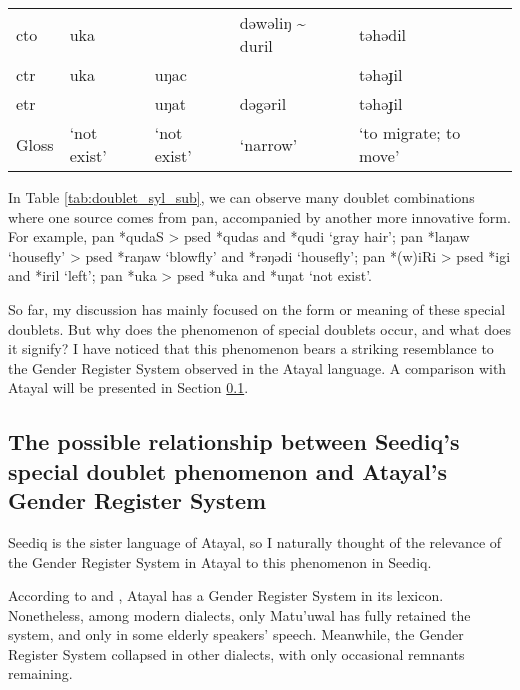 \begin{table}[!htbp]
\begin{tabular}{lllll}
\acs{cto}  & uka          &                                                  & dəwəliŋ \~{} duril & təhədil              \\
\acs{ctr}  & uka          & uŋac                                             &                    & təhəɟil              \\
\acs{etr}  &              & uŋat                                             & dəgəril            & təhəɟil              \\
Gloss      & `not exist'  & `not exist'                                      & `narrow'           & `to migrate; to move' \\ \hline
\end{tabular}
\end{table}

In Table \ref{tab:doublet_syl_sub}, we can observe many doublet combinations where one source comes from \acl{pan}, accompanied by another more innovative form. For example, \acs{pan} *qudaS > \acl{psed} *qudas and *qudi `gray hair'; \acs{pan} *laŋaw `housefly' > \acl{psed} *raŋaw `blowfly' and *rəŋədi `housefly'; \acs{pan} *(w)iRi > \acl{psed} *igi and *iril `left'; \acs{pan} *uka > \acl{psed} *uka and *uŋat `not exist'.

So far, my discussion has mainly focused on the form or meaning of these special doublets. But why does the phenomenon of special doublets occur, and what does it signify? I have noticed that this phenomenon bears a striking resemblance to the Gender Register System observed in the Atayal language. A comparison with Atayal will be presented in Section \ref{sec:sed_ata_grs}.

\subsection{The possible relationship between Seediq's special doublet phenomenon and Atayal's Gender Register System} \label{sec:sed_ata_grs}

Seediq is the sister language of Atayal, so I naturally thought of the relevance of the Gender Register System in Atayal to this phenomenon in Seediq.

According to \textcite{li1980gender,li1982gender,li1983gender} and \textcite{goderich2020phd}, Atayal has a Gender Register System in its lexicon. Nonetheless, among modern dialects, only Matu'uwal has fully retained the system, and only in some elderly speakers' speech. Meanwhile, the Gender Register System collapsed in other dialects, with only occasional remnants remaining.

